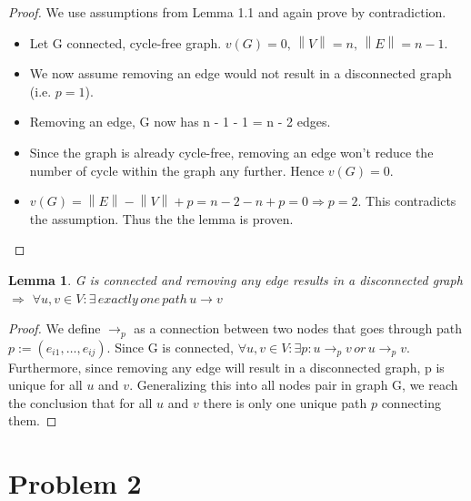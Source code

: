 \documentclass[a4paper]{article}
\newtheorem{lemma}[theorem]{Lemma}
\begin{document}
\begin{proof}
We use assumptions from Lemma 1.1 and again prove by contradiction.

\begin{itemize}
\item Let G connected, cycle-free graph. \(v(G) = 0,\, \left\|V\right\| = n,\, \left\|E\right\| = n - 1\).

\item We now assume removing an edge would not result in a disconnected graph (i.e. \(p = 1\)).

\item Removing an edge, G now has n - 1 - 1 = n - 2 edges.

\item Since the graph is already cycle-free, removing an edge won't reduce the number of cycle within the graph any further. Hence \(v(G) = 0\).

\item \(v(G) = \left\|E\right\| - \left\|V\right\| + p = n - 2 - n + p = 0 \Rightarrow p = 2\). This contradicts the assumption. Thus the the lemma is proven.
\end{itemize}
\end{proof}

\begin{lemma}
G is connected and removing any edge results in a disconnected graph \(\Rightarrow\) \(\forall u, v \in V: \exists \, exactly \, one \, path \, u \rightarrow v\)
\end{lemma}

\begin{proof}
We define \(\rightarrow_p\) as a connection between two nodes that goes through path \(p := (e_{i1}, \dots, e_{ij})\). Since G is connected, \(\forall u, v \in V: \exists p: u \rightarrow_p v \, or \, u \rightarrow_p v.\) Furthermore, since removing any edge will result in a disconnected graph, p is unique for all \(u\) and \(v\). Generalizing this into all nodes pair in graph G, we reach the conclusion that for all \(u\) and \(v\) there is only one unique path \(p\) connecting them.

\end{proof}

\section{Problem 2}
\end{document}
